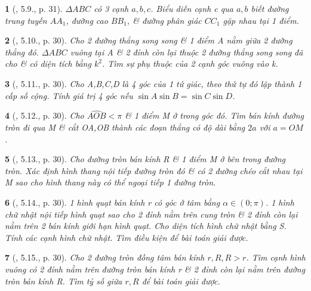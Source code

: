 \documentclass{article}
\newtheorem{baitoan}{}
\begin{document}
\begin{baitoan}[\cite{Hai_Hung_Thu_Tung2022_tap_1}, 5.9., p. 31]
	$\Delta ABC$ có 3 cạnh $a,b,c$. Biểu diễn cạnh c qua $a,b$ biết đường trung tuyến $AA_1$, đường cao $BB_1$, \& đường phân giác $CC_1$ gặp nhau tại 1 điểm.
\end{baitoan}

\begin{baitoan}[\cite{Hai_Hung_Thu_Tung2022_tap_1}, 5.10., p. 30]
	Cho 2 đường thẳng song song \& 1 điểm A nằm giữa 2 đường thẳng đó. $\Delta ABC$ vuông tại A \& 2 đỉnh còn lại thuộc 2 đường thẳng song song đã cho \& có diện tích bằng $k^2$. Tìm sự phụ thuộc của 2 cạnh góc vuông vào k.
\end{baitoan}

\begin{baitoan}[\cite{Hai_Hung_Thu_Tung2022_tap_1}, 5.11., p. 30]
	Cho A,B,C,D là 4 góc của 1 tứ giác, theo thứ tự đó lập thành 1 cấp số cộng. Tính giá trị 4 góc nếu $\sin A\sin B = \sin C\sin D$.
\end{baitoan}

\begin{baitoan}[\cite{Hai_Hung_Thu_Tung2022_tap_1}, 5.12., p. 30]
	Cho $\widehat{AOB} < \pi$ \& 1 điểm M ở trong góc đó. Tìm bán kính đường tròn đi qua M \& cắt OA,OB thành các đoạn thẳng có độ dài bằng $2a$ với $a = OM$.
\end{baitoan}

\begin{baitoan}[\cite{Hai_Hung_Thu_Tung2022_tap_1}, 5.13., p. 30]
	Cho đường tròn bán kính R \& 1 điểm M ở bên trong đường tròn. Xác định hình thang nội tiếp đường tròn đó \& có 2 đường chéo cắt nhau tại M sao cho hình thang này có thể ngoại tiếp 1 đường tròn.
\end{baitoan}

\begin{baitoan}[\cite{Hai_Hung_Thu_Tung2022_tap_1}, 5.14., p. 30]
	1 hình quạt bán kính r có góc ở tâm bằng $\alpha\in(0;\pi)$. 1 hình chữ nhật nội tiếp hình quạt sao cho 2 đỉnh nằm trên cung tròn \& 2 đỉnh còn lại nằm trên 2 bán kính giới hạn hình quạt. Cho diện tích hình chữ nhật bằng S. Tính các cạnh hình chữ nhật. Tìm điều kiện để bài toán giải được.
\end{baitoan}

\begin{baitoan}[\cite{Hai_Hung_Thu_Tung2022_tap_1}, 5.15., p. 30]
	Cho 2 đường tròn đồng tâm bán kính $r,R,R > r$. Tìm cạnh hình vuông có 2 đỉnh nằm trên đường tròn bán kính r \& 2 đỉnh còn lại nằm trên đường tròn bán kính R. Tìm tỷ số giữa $r,R$ để bài toán giải được.
\end{baitoan}
\end{document}
